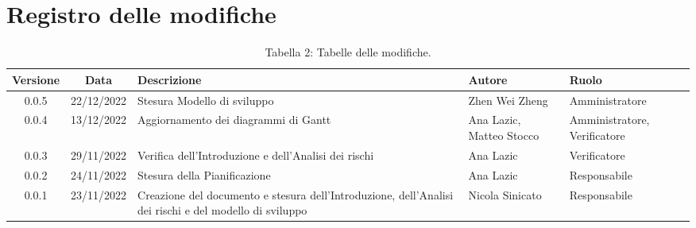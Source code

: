 \section*{Registro delle modifiche}
\begin{table}[H]
	\centering
	\renewcommand\tabularxcolumn[1]{>{\Centering}m{#1}}
	\begin{tabularx}{\textwidth}{| c | c | X | X | X |} 
	\hline
	\textbf{Versione} & \textbf{Data} & \textbf{Descrizione} & \textbf{Autore} & \textbf{Ruolo}\\
	\hline
	0.0.5 & 22/12/2022 & Stesura Modello di sviluppo & Zhen Wei Zheng & Amministratore\\
	\hline
	0.0.4 & 13/12/2022 & Aggiornamento dei diagrammi di Gantt & Ana Lazic, Matteo Stocco & Amministratore, Verificatore\\
	\hline
	0.0.3 & 29/11/2022 & Verifica dell'Introduzione e dell'Analisi dei rischi & Ana Lazic & Verificatore\\
	\hline
	0.0.2 & 24/11/2022 & Stesura della Pianificazione & Ana Lazic & Responsabile\\
	\hline
	0.0.1 & 23/11/2022 & Creazione del documento e stesura dell'Introduzione, dell'Analisi dei rischi e del modello di sviluppo & Nicola Sinicato & Responsabile\\
 	\hline
	\end{tabularx}
	\vspace{10pt}
	\caption{Tabella 2: Tabelle delle modifiche.}
\end{table}
